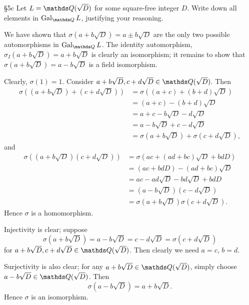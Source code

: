 \documentclass{homework}
\begin{document}
\begin{problem}{\S 5c}
  Let $L=\Q(\sqrt{D})$ for some square-free integer $D$. Write down all elements in $\Gal_{\Q}L$,
  justifying your reasoning.
\end{problem}

\begin{solution}
  We have shown that $\sigma(a+b\sqrt{D})=a\pm b\sqrt{D}$ are the only two possible automorphisms in
  $\Gal_{\Q}L$. The identity automorphism, $\sigma_I(a+b\sqrt{D})=a+b\sqrt{D}$ is clearly an
  isomorphism; it remains to show that $\sigma(a+b\sqrt{D})=a-b\sqrt{D}$ is a field isomorphism.

  Clearly, $\sigma(1)=1$.
  Consider $a+b\sqrt{D},c+d\sqrt{D}\in \Q(\sqrt{D})$. Then
  \begin{align*}
    \sigma((a+b\sqrt{D})+(c+d\sqrt{D}))&= \sigma((a+c)+(b+d)\sqrt{D}) \\
                                       &= (a+c)-(b+d)\sqrt{D} \\
                                       &= a+c-b\sqrt{D}-d\sqrt{D} \\
                                       &= a-b\sqrt{D}+c-d\sqrt{D}  \\
                                       &= \sigma(a+b\sqrt{D})+\sigma(c+d\sqrt{D})
  ,\end{align*} and 
  \begin{align*}
    \sigma((a+b\sqrt{D})(c+d\sqrt{D}))&= \sigma(ac+(ad+bc)\sqrt{D}+bdD) \\
                                      &= (ac+bdD)-(ad+bc)\sqrt{D}\\
                                      &=ac-ad\sqrt{D}-bd\sqrt{D}+bdD\\
                                      &=(a-b\sqrt{D})(c-d\sqrt{D})\\
                                      &=\sigma(a+b\sqrt{D})\sigma(c+d\sqrt{D})  
  .\end{align*}
  Hence $\sigma$ is a homomorphism.

  Injectivity is clear; suppose \[
    \sigma(a+b\sqrt{D})=a-b\sqrt{D}=c-d\sqrt{D}=\sigma(c+d\sqrt{D})
  \] for $a+b\sqrt{D}, c+d\sqrt{D}\in \Q(\sqrt{D})$. Then clearly we need $a=c$, $b=d$.

  Surjectivity is also clear; for any $a+b\sqrt{D}\in \Q(\sqrt{D})$, simply choose $a-b\sqrt{D}\in
  \Q(\sqrt{D})$. Then \[
    \sigma(a-b\sqrt{D})=a+b\sqrt{D}
  .\] Hence $\sigma$ is an isomorphism.
\end{solution}
\end{document}
